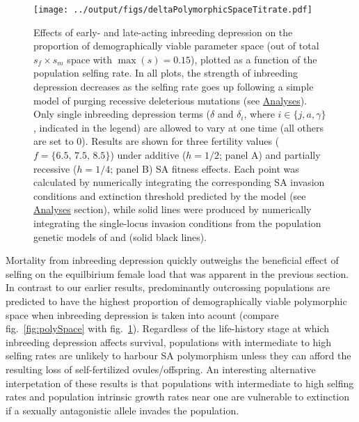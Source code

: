 \documentclass[11pt]{article}
\begin{document}
 \begin{figure}[htbp]
 \centering
 \texttt{[image: ../output/figs/deltaPolymorphicSpaceTitrate.pdf]}
 \caption{\footnotesize{Effects of early- and late-acting inbreeding depression on the proportion of demographically viable parameter space (out of total $s_f \times s_m$ space with $\max(s) = 0.15$), plotted as a function of the population selfing rate. In all plots, the strength of inbreeding depression decreases as the selfing rate goes up following a simple model of purging recessive deleterious mutations (see \hyperref[subsec:analyses]{Analyses}). Only single inbreeding depression terms ($\delta$ and $\delta_i$, where $i \in \{j,a,\gamma\}$, indicated in the legend) are allowed to vary at one time (all others are set to $0$). Results are shown for three fertility values ($f = \{6.5,\,7.5,\,8.5\}$) under additive ($h = 1/2$; panel A) and partially recessive ($h = 1/4$; panel B) SA fitness effects. Each point was calculated by numerically integrating the corresponding SA invasion conditions and extinction threshold predicted by the model (see \hyperref[subsec:analyses]{Analyses} section), while solid lines were produced by numerically integrating the single-locus invasion conditions from the population genetic models of \citet{JordanConnallon2014} and \citet{Olito2017} (solid black lines).}} 
 \label{fig:deltaPolySpace}
 \end{figure}


Mortality from inbreeding depression quickly outweighs the beneficial effect of selfing on the equilbirium female load that was apparent in the previous section. In contrast to our earlier results, predominantly outcrossing populations are predicted to have the highest proportion of demographically viable polymorphic space when inbreeding depression is taken into acount (compare fig.~\ref{fig:polySpace} with fig.~\ref{fig:deltaPolySpace}). Regardless of the life-history stage at which inbreeding depression affects survival, populations with intermediate to high selfing rates are unlikely to harbour SA polymorphism unless they can afford the resulting loss of self-fertilized ovules/offspring. An interesting alternative interpetation of these results is that populations with intermediate to high selfing rates and population intrinsic growth rates near one are vulnerable to extinction if a sexually antagonistic allele invades the population.
\end{document}
